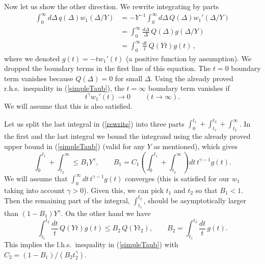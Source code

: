 \documentclass[12pt]{article}
\newcommand{\reef}[1]{(\ref{#1})}
\newcommand{\beq}{\begin{equation}}
\newcommand{\eeq}{\end{equation}}
\def\nn{\nonumber}
\def\le{\leqslant}
\def\nn{\nonumber}
\newcommand{\D}{\Delta}
\numberwithin{equation}{section}
\begin{document}
Now let us show the other direction. We rewrite integrating by parts
\begin{align}
\int_0^\infty d\D\,q(\D) w_1(\Delta/Y) &= - Y^{-1} \int_0^\infty d\D\, Q(\Delta) w_1'(\Delta/Y)\nn\\
 &= \int_0^\infty \frac{d\D}\D\, Q(\Delta) g(\Delta/Y) \nn\\
 &= \int_0^\infty \frac{d t}t\, Q(Y t) g(t) \,,
 \label{rewrite}
\end{align}
where we denoted $g(t)=-t w_1'(t)$ (a positive function by assumption). We dropped the boundary terms in the first line of this equation. The $t=0$ boundary term vanishes because $Q(\Delta)=0$ for small $\Delta$. Using the already proved r.h.s.~inequality in \reef{simpleTaub}, the $t=\infty$ boundary term vanishes if
\beq
t^\gamma w_1'(t) \to 0 \qquad(t\to\infty).
\eeq
We will assume that this is also satisfied. 

Let us split the last integral in \reef{rewrite} into three parts 
$\int_0^{t_1}+\int_{t_1}^{t_2}+\int_{t_2}^\infty$. In the first and the last integral we bound the integrand using the already proved upper bound in \reef{simpleTaub} (valid for any $Y$ as mentioned), which gives
\beq
\label{tailsEst}
\int_0^{t_1}+\int_{t_2}^\infty \le B_1 Y^\gamma,\qquad B_1 = C_1 \left(\int_0^{t_1}+\int_{t_2}^\infty\right) dt\,t^{\gamma-1} g(t) .
\eeq
We will assume that $\int_0^\infty dt\,t^{\gamma-1} g(t)$ converges (this is satisfied for our $w_1$ taking into account $\gamma>0$). Given this, we can pick $t_1$ and $t_2$ so that $B_1<1$. Then the remaining part of the integral, $\int_{t_1}^{t_2}$, should be asymptotically larger than $(1-B_1)Y^\gamma$. On the other hand we have
\beq
\int_{t_1}^{t_2} \frac{d t}t\, Q(Y t) g(t) \le B_2\, Q(Y t_2) ,\qquad B_2 = \int_{t_1}^{t_2} \frac{d t}t\, g(t).
\eeq
This implies the l.h.s.~inequality in \reef{simpleTaub} with $C_2 = (1-B_1)/(B_2 t_2^\gamma)$.
\end{document}
